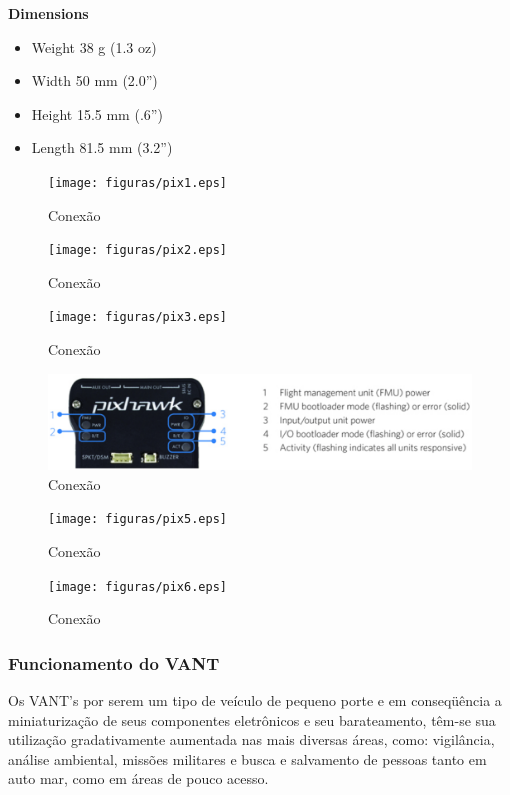 \textbf{Dimensions}
\begin{itemize}
\item Weight 38 g (1.3 oz)
\item Width 50 mm (2.0”)
\item Height 15.5 mm (.6”)
\item Length 81.5 mm (3.2”)
\end{itemize}

\begin{figure}[h!]
	\centering
	  \texttt{[image: figuras/pix1.eps]}
	\caption{Conexão}
	\label{fig:pix1}
\end{figure}

\begin{figure}[h!]
	\centering
	  \texttt{[image: figuras/pix2.eps]}
	\caption{Conexão}
	\label{fig:pix2}
\end{figure}

\begin{figure}[h!]
	\centering
	  \texttt{[image: figuras/pix3.eps]}
	\caption{Conexão}
	\label{fig:pix3}
\end{figure}

\begin{figure}[h!]
	\centering
	  \includegraphics[keepaspectratio=true,scale=0.6]{figuras/pix4.eps}
	\caption{Conexão}
	\label{fig:pix4}
\end{figure}

\begin{figure}[h!]
	\centering
	  \texttt{[image: figuras/pix5.eps]}
	\caption{Conexão}
	\label{fig:pix5}
\end{figure}

\begin{figure}[h!]
	\centering
	  \texttt{[image: figuras/pix6.eps]}
	\caption{Conexão}
	\label{fig:pix6}
\end{figure}


\subsubsection{Funcionamento do VANT}

Os VANT's por serem um tipo de veículo de pequeno porte e em conseqüência a miniaturização de seus componentes eletrônicos e seu barateamento, têm-se sua utilização gradativamente aumentada nas mais diversas áreas, como: vigilância, análise ambiental, missões militares e busca e salvamento de pessoas tanto em auto mar, como em áreas de pouco acesso. \cite{Branco}

